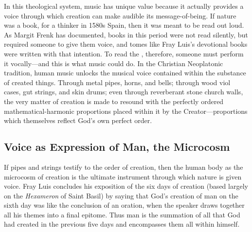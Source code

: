 In this theological system, music has unique value because it actually provides
a voice through which creation can make audible its message-of-being.
If nature was a book, for a thinker in 1580s Spain, then it was meant to be
read out loud.
As Margit Frenk has documented, books in this period were not read silently,
but required someone to give them voice, and tomes like Fray Luis's devotional
books were written with that intention.%
    \Autocite{Frenk:Voz}
To read the , therefore, someone must perform it
vocally---and this is what music could do.
In the Christian Neoplatonic tradition, human music unlocks the musical voice
contained within the substance of created things.
Through metal pipes, horns, and bells; through wood viol cases, gut strings,
and skin drums; even through reverberant stone church walls, the very matter of
creation is made to resound with the perfectly ordered mathematical-harmonic
proportions placed within it by the Creator---proportions which themselves
reflect God's own perfect order.


\subsection{Voice as Expression of Man, the Microcosm}

If pipes and strings testify to the order of creation, then the human body as
the microcosm of creation is the ultimate instrument through which nature is
given voice.
Fray Luis concludes his exposition of the six days of creation (based largely
on the \emph{Hexameron} of Saint Basil) by saying that God's creation of man on
the sixth day was like the conclusion of an oration, when the speaker draws
together all his themes into a final epitome.
Thus man is the summation of all that God had created in the previous five days
and encompasses them all within himself.%
    \Autocite[243]{LuisdeGranada:Simbolo}


